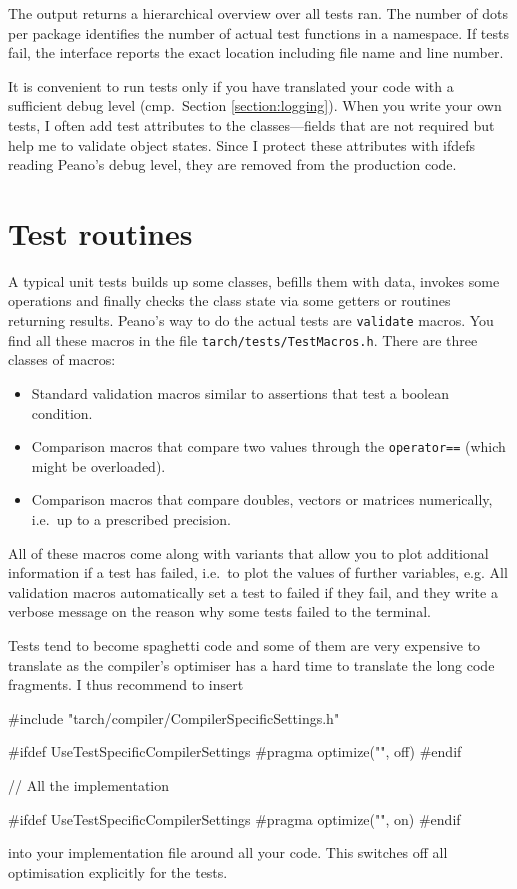 \noindent
The output returns a hierarchical overview over all tests ran. 
The number of dots per package identifies the number of actual test functions in
a namespace.
If tests fail, the interface reports the exact location including file name and
line number.


\begin{remark}
  It is convenient to run tests only if you have translated your code with a 
  sufficient debug level (cmp.~Section \ref{section:logging}).
  When you write your own tests, I often add test attributes to the
  classes---fields that are not required but help me to validate object
  states. Since I protect these attributes with ifdefs reading Peano's debug
  level, they are removed from the production code.
\end{remark}



\section{Test routines}

A typical unit tests builds up some classes, befills them with data, invokes
some operations and finally checks the class state via some getters or routines
returning results.
Peano's way to do the actual tests are \texttt{validate} macros.
You find all these macros in the file \texttt{tarch/tests/TestMacros.h}.
There are three classes of macros:

\begin{itemize}
  \item Standard validation macros similar to assertions that test a boolean
  condition.
  \item Comparison macros that compare two values through the
  \texttt{operator==} (which might be overloaded).
  \item Comparison macros that compare doubles, vectors or matrices numerically,
  i.e.~up to a prescribed precision.
\end{itemize}

\noindent
All of these macros come along with variants that allow you to plot additional
information if a test has failed, i.e.~to plot the values of further variables,
e.g.
All validation macros automatically set a test to failed if they fail, and they
write a verbose message on the reason why some tests failed to the terminal.  



  Tests tend to become spaghetti code and some of them are very expensive to
  translate as the compiler's optimiser has a hard time to translate the long
  code fragments.
  I thus recommend to insert
  \begin{code}
#include "tarch/compiler/CompilerSpecificSettings.h"

#ifdef UseTestSpecificCompilerSettings
#pragma optimize("", off)
#endif

// All the implementation

#ifdef UseTestSpecificCompilerSettings
#pragma optimize("", on)
#endif
  \end{code}
  into your implementation file around all your code. This switches off all
  optimisation explicitly for the tests.


